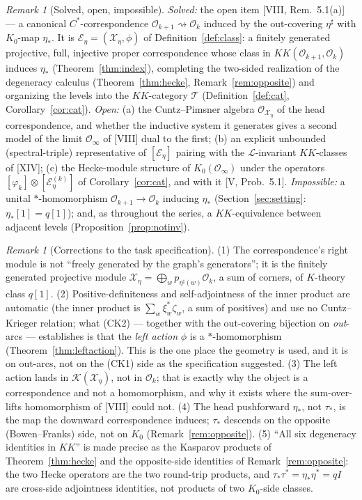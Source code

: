 \documentclass[11pt]{amsart}
\numberwithin{equation}{section}
\theoremstyle{definition}
\theoremstyle{remark}
\newtheorem{remark}[theorem]{Remark}
\newcommand{\cO}{\mathcal{O}}
\newcommand{\cX}{\mathcal{X}}
\newcommand{\cE}{\mathcal{E}}
\newcommand{\cK}{\mathcal{K}}
\newcommand{\cL}{\mathcal{L}}
\newcommand{\KK}{\mathit{KK}}
\newcommand{\ta}{\tau_*}
\newcommand{\taup}{\tau^*}
\newcommand{\et}{\eta_*}
\newcommand{\etp}{\eta^*}
\begin{document}
\begin{remark}[Solved, open, impossible]\label{rem:scope}
\emph{Solved:} the open item [VIII, Rem.~5.1(a)] --- a canonical $C^*$-correspondence
$\cO_{k+1}\rightsquigarrow\cO_k$ induced by the out-covering $\eta^{\sharp}$ with $K_0$-map
$\et$. It is $\cE_\eta=(\cX_\eta,\phi)$ of Definition~\ref{def:class}: a finitely generated
projective, full, injective proper correspondence whose class in $\KK(\cO_{k+1},\cO_k)$
induces $\et$ (Theorem~\ref{thm:index}), completing the two-sided realization of the
degeneracy calculus (Theorem~\ref{thm:hecke}, Remark~\ref{rem:opposite}) and organizing the
levels into the $\KK$-category $\mathcal{T}$ (Definition~\ref{def:cat},
Corollary~\ref{cor:cat}). \emph{Open:} (a) the Cuntz--Pimsner algebra
$\cO_{\cX_\eta}$ of the head correspondence, and whether the inductive system it generates
gives a second model of the limit $\cO_\infty$ of [VIII] dual to the first; (b) an
explicit unbounded (spectral-triple) representative of $[\cE_\eta]$ pairing with the
$\cL$-invariant $KK$-classes of [XIV]; (c) the Hecke-module structure of $K_0(\cO_\infty)$
under the operators $[\varphi_k]\otimes[\cE_\eta^{(k)}]$ of Corollary~\ref{cor:cat}, and with
it [V, Prob.~5.1]. \emph{Impossible:} a unital $*$-homomorphism $\cO_{k+1}\to\cO_k$
inducing $\et$ (Section~\ref{sec:setting}: $\et[1]=q[1]$); and, as throughout the series, a
$\KK$-equivalence between adjacent levels (Proposition~\ref{prop:notinv}).
\end{remark}

\begin{remark}[Corrections to the task specification]\label{rem:corrections}
(1) The correspondence's right module is not ``freely generated by the graph's
generators''; it is the finitely generated projective module
$\cX_\eta=\bigoplus_{w}p_{\eta^{\sharp}(w)}\cO_k$, a sum of corners, of $K$-theory class
$q[1]$. (2) Positive-definiteness and self-adjointness of the inner product are automatic
(the inner product is $\sum_w\xi_w^{*}\zeta_w$, a sum of positives) and use no
Cuntz--Krieger relation; what (CK2) --- together with the out-covering bijection on
\emph{out}-arcs --- establishes is that the \emph{left action} $\phi$ is a
$*$-homomorphism (Theorem~\ref{thm:leftaction}). This is the one place the geometry is
used, and it is on out-arcs, not on the (CK1) side as the specification suggested. (3) The
left action lands in $\cK(\cX_\eta)$, not in $\cO_k$; that is exactly why the object is a
correspondence and not a homomorphism, and why it exists where the sum-over-lifts
homomorphism of [VIII] could not. (4) The head pushforward $\et$, not $\ta$, is the map the
downward correspondence induces; $\ta$ descends on the opposite (Bowen--Franks) side, not on
$K_0$ (Remark~\ref{rem:opposite}). (5) ``All six degeneracy identities in $\KK$'' is made
precise as the Kasparov products of Theorem~\ref{thm:hecke} and the opposite-side identities
of Remark~\ref{rem:opposite}: the two Hecke operators are the two round-trip products, and
$\ta\taup=\et\etp=qI$ are cross-side adjointness identities, not products of two
$K_0$-side classes.
\end{remark}
\end{document}
